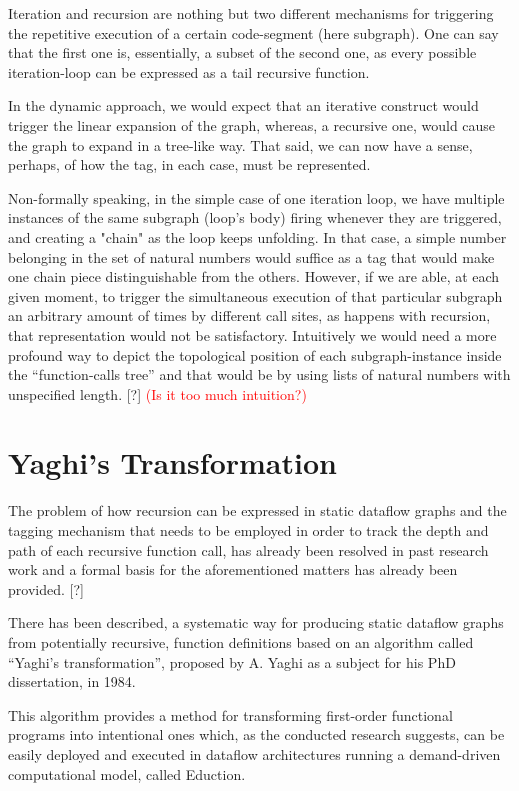 \documentclass[ack,preface]{dithesis}
\begin{document}
Iteration and recursion are nothing but two different mechanisms for triggering the repetitive execution of a certain code-segment (here subgraph). One can say that the first one is, essentially, a subset of the second one, as every possible iteration-loop can be expressed as a tail recursive function. 

In the dynamic approach, we would expect that an iterative construct would trigger the linear expansion of the graph, whereas, a recursive one, would cause the graph to expand in a tree-like way. That said, we can now have a sense, perhaps, of how the tag, in each case, must be represented. 

Non-formally speaking, in the simple case of one iteration loop, we have multiple instances of the same subgraph (loop’s body) firing whenever they are triggered, and creating a "chain" as the loop keeps unfolding. In that case, a simple number belonging in the set of natural numbers would suffice as a tag that would make one chain piece distinguishable from the others. However, if we are able, at each given moment, to trigger the simultaneous execution of that particular subgraph an arbitrary amount of times by different call sites, as happens with recursion, that representation would not be satisfactory. Intuitively we would need a more profound way to depict the topological position of each subgraph-instance inside the “function-calls tree” and that would be by using lists of natural numbers with unspecified length. [?] \textcolor{red}{(Is it too much intuition?)}





    \section{Yaghi's Transformation}

The problem of how recursion can be expressed in static dataflow graphs and the tagging mechanism that needs to be employed in order to track the depth and path of each recursive function call, has already been resolved in past research work and a formal basis for the aforementioned matters has already been provided. [?]

There has been described, a systematic way for producing static dataflow graphs from potentially recursive, function definitions based on an algorithm called “Yaghi’s transformation”, proposed by A. Yaghi as a subject for his PhD dissertation, in 1984.

This algorithm provides a method for transforming first-order functional programs into intentional ones which, as the conducted research suggests, can be easily deployed and executed in dataflow architectures running a demand-driven computational model, called Eduction.
\end{document}
